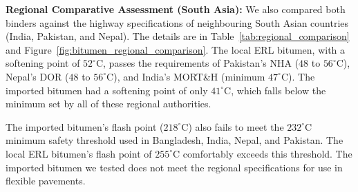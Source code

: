 \documentclass[12pt,a4paper]{article}
\begin{document}
\noindent\textbf{Regional Comparative Assessment (South Asia):}
We also compared both binders against the highway specifications of neighbouring South Asian countries (India, Pakistan, and Nepal). The details are in Table~\ref{tab:regional_comparison} and Figure~\ref{fig:bitumen_regional_comparison}. The local ERL bitumen, with a softening point of $52^{\circ}\text{C}$, passes the requirements of Pakistan's NHA ($48$ to $56^{\circ}\text{C}$), Nepal's DOR ($48$ to $56^{\circ}\text{C}$), and India's MORT\&H (minimum $47^{\circ}\text{C}$). The imported bitumen had a softening point of only $41^{\circ}\text{C}$, which falls below the minimum set by all of these regional authorities.

The imported bitumen's flash point ($218^{\circ}\text{C}$) also fails to meet the $232^{\circ}\text{C}$ minimum safety threshold used in Bangladesh, India, Nepal, and Pakistan. The local ERL bitumen's flash point of $255^{\circ}\text{C}$ comfortably exceeds this threshold. The imported bitumen we tested does not meet the regional specifications for use in flexible pavements.

\begin{table}[htbp]
    \centering
    \caption{Comparative analysis of physical properties between experimental bitumen and South Asian standards.}
    \label{tab:regional_comparison}
    \renewcommand{\arraystretch}{1.3}
\end{table}
\end{document}
